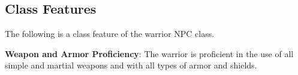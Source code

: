 				
\subsection{Class Features}

				
The following is a class feature of the warrior NPC class.
				
\textbf{Weapon and Armor Proficiency}: The warrior is proficient in the use of all simple and martial weapons and with all types of armor and shields.
        	
